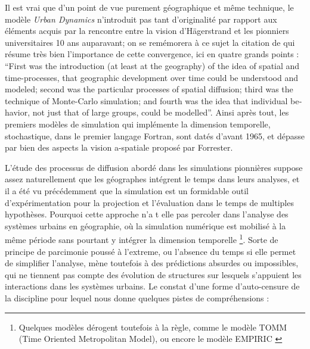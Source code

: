 Il est vrai que d'un point de vue purement géographique et même technique, le modèle \textit{Urban Dynamics} n'introduit pas tant d'originalité par rapport aux éléments acquis par la rencontre entre la vision d'Hägerstrand et les pionniers universitaires 10 ans auparavant; on se remémorera à ce sujet la citation de \textcite{Morril2005} qui résume très bien l'importance de cette convergence, ici en quatre grands points : \foreignquote{english}{First was the introduction (at least at the geography) of the idea of spatial and time-processes, that geographic development over time could be understood and modeled; second was the particular processes of spatial diffusion; third was the technique of Monte-Carlo simulation; and fourth was the idea that individual behavior, not just that of large groups, could be modelled}. Ainsi après tout, les premiers modèles de simulation qui implémente la dimension temporelle, stochastique, dans le premier langage Fortran, sont datés d'avant 1965, et dépasse par bien des aspects la vision a-spatiale proposé par Forrester.

L'étude des processus de diffusion abordé dans les simulations pionnières suppose assez naturellement que les géographes intégrent le temps dans leurs analyses, et il a été vu précédemment que la simulation est un formidable outil d'expérimentation pour la projection et l'évaluation dans le temps de multiples hypothèses. Pourquoi cette approche n'a t elle pas percoler dans l'analyse des systèmes urbains en géographie, où la simulation numérique est mobilisé à la même période sans pourtant y intégrer la dimension temporelle \footnote{Quelques modèles dérogent toutefois à la règle, comme le modèle TOMM (Time Oriented Metropolitan Model), ou encore le modèle EMPIRIC \textcite{Batty1972} }. Sorte de principe de parcimonie poussé à l'extreme, ou l'absence du temps si elle permet de simplifier l'analyse, mène toutefois à des prédictions absurdes ou impossibles, qui ne tiennent pas compte des évolution de structures sur lesquels s'appuient les interactions dans les systèmes urbains. Le constat d'une forme d'auto-censure de la discipline pour lequel \textcite[296-297]{Batty1976} nous donne quelques pistes de compréhensions : 

